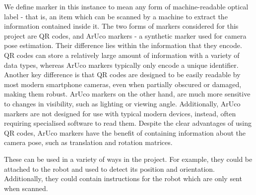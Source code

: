 \documentclass{l4proj}
\begin{document}
We define marker in this instance to mean any form of machine-readable optical label - that is, an item which can be scanned by a machine to extract the information contained inside it. The two forms of markers considered for this project are QR codes, and ArUco markers - a synthetic marker used for camera pose estimation. Their difference lies within the information that they encode. QR codes can store a relatively large amount of information with a variety of data types, whereas ArUco markers typically only encode a unique identifier. Another key difference is that QR codes are designed to be easily readable by most modern smartphone cameras, even when partially obscured or damaged, making them robust. ArUco markers on the other hand, are much more sensitive to changes in visibility, such as lighting or viewing angle. Additionally, ArUco markers are not designed for use with typical modern devices, instead, often requiring specialised software to read them. Despite the clear advantages of using QR codes, ArUco markers have the benefit of containing information about the camera pose, such as translation and rotation matrices.

These can be used in a variety of ways in the project. For example, they could be attached to the robot and used to detect its position and orientation. Additionally, they could contain instructions for the robot which are only sent when scanned.
\end{document}
